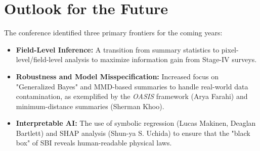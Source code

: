 \documentclass[11pt]{article}
\begin{document}
\section{Outlook for the Future}
The conference identified three primary frontiers for the coming years:
\begin{itemize}
    \item \textbf{Field-Level Inference:} A transition from summary statistics to pixel-level/field-level analysis to maximize information gain from Stage-IV surveys.
    \item \textbf{Robustness and Model Misspecification:} Increased focus on "Generalized Bayes" and MMD-based summaries to handle real-world data contamination, as exemplified by the \textit{OASIS} framework (Arya Farahi) and minimum-distance summaries (Sherman Khoo).
    \item \textbf{Interpretable AI:} The use of symbolic regression (Lucas Makinen, Deaglan Bartlett) and SHAP analysis (Shun-ya S. Uchida) to ensure that the "black box" of SBI reveals human-readable physical laws.
\end{itemize}
\end{document}
